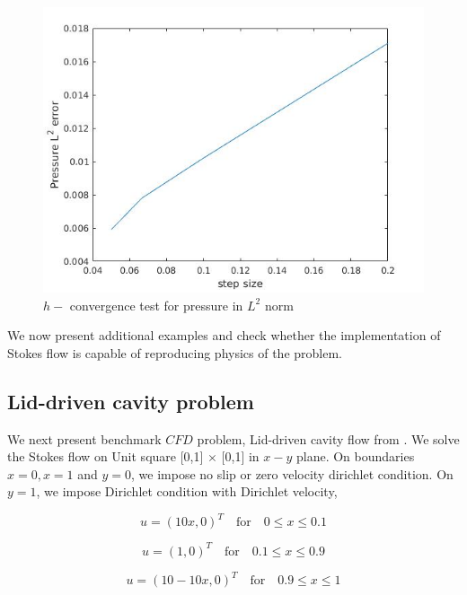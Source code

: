 \documentclass[a4paper,12pt]{book}
\begin{document}
\begin{figure}
  \includegraphics[width=\linewidth]{pressure_error_stokes.jpg}
  \caption{$h-$ convergence test for pressure in $L^2$ norm}
  \label{fig:pre_stoke_conv}
\end{figure}

We now present additional examples and check whether the implementation of Stokes flow is capable of reproducing physics of the problem.

\subsection{Lid-driven cavity problem}

We next present benchmark $CFD$ problem, Lid-driven cavity flow from \cite{Montlaur}. We solve the Stokes flow on Unit square [0,1] $\times$ [0,1] in $x-y$ plane. On boundaries ${x = 0}, {x = 1}$ and ${y = 0}$, we impose no slip or zero velocity dirichlet condition. On ${y = 1}$, we impose Dirichlet condition with Dirichlet velocity,

\begin{center}

\begin{equation}
u = (10x,0)^T \quad \textrm{for} \quad 0 \leq x \leq 0.1
\end{equation}

\begin{equation}
u = (1,0)^T \quad \textrm{for} \quad 0.1 \leq x \leq 0.9
\end{equation}

\begin{equation}
u = (10 - 10x,0)^T \quad \textrm{for} \quad 0.9 \leq x \leq 1
\end{equation}

\end{center}
\end{document}
